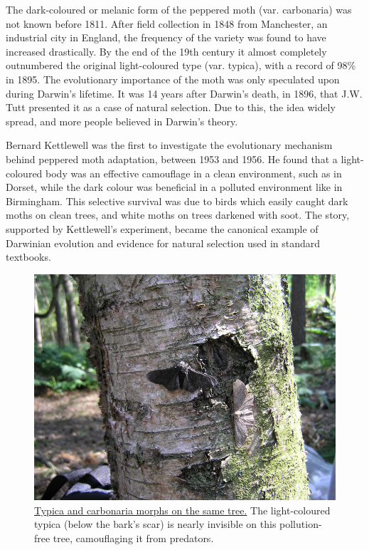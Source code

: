 The dark-coloured or melanic form of the peppered moth (var. carbonaria) was not known before 1811. After field collection in 1848 from Manchester, an industrial city in England, the frequency of the variety was found to have increased drastically. By the end of the 19th century it almost completely outnumbered the original light-coloured type (var. typica), with a record of 98\% in 1895. The evolutionary importance of the moth was only speculated upon during Darwin's lifetime. It was 14 years after Darwin's death, in 1896, that J.W. Tutt presented it as a case of natural selection. Due to this, the idea widely spread, and more people believed in Darwin's theory.

Bernard Kettlewell was the first to investigate the evolutionary mechanism behind peppered moth adaptation, between 1953 and 1956. He found that a light-coloured body was an effective camouflage in a clean environment, such as in Dorset, while the dark colour was beneficial in a polluted environment like in Birmingham. This selective survival was due to birds which easily caught dark moths on clean trees, and white moths on trees darkened with soot. The story, supported by Kettlewell's experiment, became the canonical example of Darwinian evolution and evidence for natural selection used in standard textbooks.



\begin{figure}

{\centering \includegraphics[width=0.7\linewidth]{./figures/evolution/Lichte_en_zwarte_versie_berkenspanner} 

}

\caption{\href{https://commons.wikimedia.org/wiki/File:Lichte_en_zwarte_versie_berkenspanner.jpg}{Typica and carbonaria morphs on the same tree.} The light-coloured typica (below the bark's scar) is nearly invisible on this pollution-free tree, camouflaging it from predators.}\label{fig:mothstree}
\end{figure}

